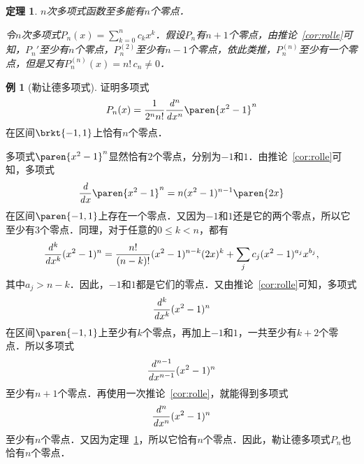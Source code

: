 \documentclass[a4paper,punct=CCT]{ctexbook}
\makeatletter
\newtheorem{theorem}{定理}
\theoremstyle{definition}
\newtheorem*{example*}{例}
\theoremstyle{remark}
\renewcommand*{\proofname}{证}
\renewenvironment{proof}[1][\proofname]{\par
  \pushQED{\qed}%
  \normalfont \topsep6\p@\@plus6\p@\relax
  \trivlist
  \item[\hskip\labelsep
    \bfseries
    #1%
    ]\ignorespaces
}{%
  \popQED\endtrivlist\@endpefalse
}
\let\leq\leqslant
\let\le\leq
\makeatother
\begin{document}
\begin{theorem}
  \label{thm:polymaxnzero}
  \(n\)次多项式函数至多能有\(n\)个零点．

  \begin{proof}
    令\(n\)次多项式\(P_n(x) = \!\sum\limits_{k=0}^n c_k x^k\)．假设\(P_n\)有\(n+1\)个零点，由推论~\ref{cor:rolle}可知，\(P_n'\)至少有\(n\)个零点，\(P_n^{(2)}\)至少有\(n-1\)个零点，依此类推，\(P_n^{(n)}\)至少有一个零点，但是又有\(P_n^{(n)}(x) = n!\,c_n \ne 0\)．
  \end{proof}
\end{theorem}

\begin{example*}[勒让德多项式]
  证明多项式
  \begin{equation*}
    P_n(x) = \frac1{2^nn!} \ddn xn \paren{x^2-1}^n
  \end{equation*}
  在区间\(\brkt{-1,1}\)上恰有\(n\)个零点．

  \begin{proof}
    多项式\(\paren{x^2-1}^n\)显然恰有\(2\)个零点，分别为\(-1\)和\(1\)．由推论~\ref{cor:rolle}可知，多项式
    \begin{equation*}
      \ddx \paren{x^2-1}^n = n(x^2-1)^{n-1} \paren{2x}
    \end{equation*}
    在区间\(\paren{-1,1}\)上存在一个零点．又因为\(-1\)和\(1\)还是它的两个零点，所以它至少有\(3\)个零点．同理，对于任意的\(0 \le k < n\)，都有
    \begin{equation*}
      \frac{\mathop{}\!\mathit{d}^{k}}{\mathop{}\!\mathit{d} x^{k}} (x^2-1)^n = \frac{n!}{(n-k)!}(x^2-1)^{n-k} (2x)^k + \sum_j c_j (x^2-1)^{a_j} x^{b_j},
    \end{equation*}
    其中\(a_j > n-k\)．因此，\(-1\)和\(1\)都是它们的零点．又由推论~\ref{cor:rolle}可知，多项式
    \begin{equation*}
      \frac{\mathop{}\!\mathit{d}^{k}}{\mathop{}\!\mathit{d} x^{k}} (x^2-1)^n
    \end{equation*}
    在区间\(\paren{-1,1}\)上至少有\(k\)个零点，再加上\(-1\)和\(1\)，一共至少有\(k+2\)个零点．所以多项式
    \begin{equation*}
      \frac{\mathop{}\!\mathit{d}^{n-1}}{\mathop{}\!\mathit{d} x^{n-1}} (x^2-1)^n
    \end{equation*}
    至少有\(n+1\)个零点．再使用一次推论~\ref{cor:rolle}，就能得到多项式
    \begin{equation*}
      \frac{\mathop{}\!\mathit{d}^{n}}{\mathop{}\!\mathit{d} x^{n}} (x^2-1)^n
    \end{equation*}
    至少有\(n\)个零点．又因为定理~\ref{thm:polymaxnzero}，所以它恰有\(n\)个零点．因此，勒让德多项式\(P_n\)也恰有\(n\)个零点．
  \end{proof}
\end{example*}
\end{document}
